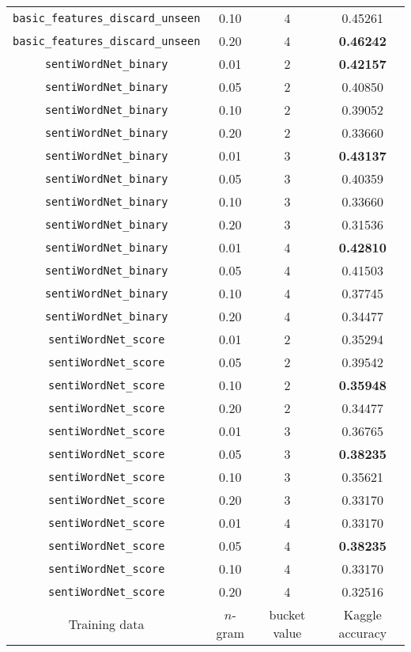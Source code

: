 \documentclass{article}
\begin{document}
{\begin{tabular}{|c|c|c|c|}
\texttt{basic\_features\_discard\_unseen} & 0.10 & 4 & 0.45261\\
\texttt{basic\_features\_discard\_unseen} & 0.20 & 4 & \textbf{0.46242}\\\hline\hline
\texttt{sentiWordNet\_binary} & 0.01 & 2 & \textbf{0.42157}\\
\texttt{sentiWordNet\_binary} & 0.05 & 2 & 0.40850\\
\texttt{sentiWordNet\_binary} & 0.10 & 2 & 0.39052\\
\texttt{sentiWordNet\_binary} & 0.20 & 2 & 0.33660\\\hline
\texttt{sentiWordNet\_binary} & 0.01 & 3 & \textbf{0.43137}\\
\texttt{sentiWordNet\_binary} & 0.05 & 3 & 0.40359\\
\texttt{sentiWordNet\_binary} & 0.10 & 3 & 0.33660\\
\texttt{sentiWordNet\_binary} & 0.20 & 3 & 0.31536\\\hline
\texttt{sentiWordNet\_binary} & 0.01 & 4 & \textbf{0.42810}\\
\texttt{sentiWordNet\_binary} & 0.05 & 4 & 0.41503\\
\texttt{sentiWordNet\_binary} & 0.10 & 4 & 0.37745\\
\texttt{sentiWordNet\_binary} & 0.20 & 4 & 0.34477\\\hline\hline
\texttt{sentiWordNet\_score} & 0.01 & 2 & 0.35294\\
\texttt{sentiWordNet\_score} & 0.05 & 2 & 0.39542\\
\texttt{sentiWordNet\_score} & 0.10 & 2 & \textbf{0.35948}\\
\texttt{sentiWordNet\_score} & 0.20 & 2 & 0.34477\\\hline
\texttt{sentiWordNet\_score} & 0.01 & 3 & 0.36765\\
\texttt{sentiWordNet\_score} & 0.05 & 3 & \textbf{0.38235}\\
\texttt{sentiWordNet\_score} & 0.10 & 3 & 0.35621\\
\texttt{sentiWordNet\_score} & 0.20 & 3 & 0.33170\\\hline
\texttt{sentiWordNet\_score} & 0.01 & 4 & 0.33170\\
\texttt{sentiWordNet\_score} & 0.05 & 4 & \textbf{0.38235}\\
\texttt{sentiWordNet\_score} & 0.10 & 4 & 0.33170\\
\texttt{sentiWordNet\_score} & 0.20 & 4 & 0.32516\\\hline
Training data & $n$-gram & bucket value & Kaggle accuracy\\\hline
\end{tabular}}\par\bigskip
\end{document}
